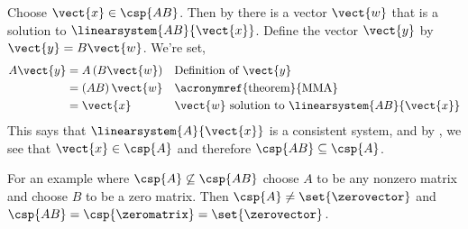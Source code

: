 Choose $\vect{x}\in\csp{AB}$.  Then by  there is a vector $\vect{w}$ that is a solution to $\linearsystem{AB}{\vect{x}}$.  Define the vector $\vect{y}$ by $\vect{y}=B\vect{w}$.  We're set,
%
\begin{align*}
A\vect{y}
&=A\left(B\vect{w}\right)&&\text{Definition of $\vect{y}$}\\
&=\left(AB\right)\vect{w}&&\text{\acronymref{theorem}{MMA}}\\
&=\vect{x}&&\text{$\vect{w}$ solution to $\linearsystem{AB}{\vect{x}}$}\\
\end{align*}
%
This says that $\linearsystem{A}{\vect{x}}$ is a consistent system, and by , we see that $\vect{x}\in\csp{A}$ and therefore $\csp{AB}\subseteq\csp{A}$.\par
%
For an example where $\csp{A}\not\subseteq\csp{AB}$ choose $A$ to be any nonzero matrix and choose $B$ to be a zero matrix.  Then $\csp{A}\neq\set{\zerovector}$ and $\csp{AB}=\csp{\zeromatrix}=\set{\zerovector}$.